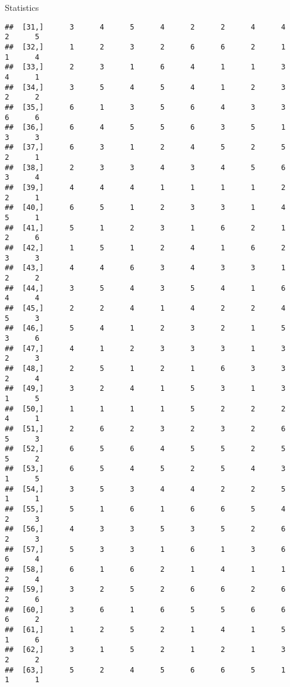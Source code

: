 \documentclass[
  ignorenonframetext,
]{beamer}
\begin{document}
\begin{frame}[fragile]{Statistics}
\begin{verbatim}
##  [31,]      3      4      5      4      2      2      4      4      2      5
##  [32,]      1      2      3      2      6      6      2      1      1      4
##  [33,]      2      3      1      6      4      1      1      3      4      1
##  [34,]      3      5      4      5      4      1      2      3      2      2
##  [35,]      6      1      3      5      6      4      3      3      6      6
##  [36,]      6      4      5      5      6      3      5      1      3      3
##  [37,]      6      3      1      2      4      5      2      5      2      1
##  [38,]      2      3      3      4      3      4      5      6      3      4
##  [39,]      4      4      4      1      1      1      1      2      2      1
##  [40,]      6      5      1      2      3      3      1      4      5      1
##  [41,]      5      1      2      3      1      6      2      1      2      6
##  [42,]      1      5      1      2      4      1      6      2      3      3
##  [43,]      4      4      6      3      4      3      3      1      2      2
##  [44,]      3      5      4      3      5      4      1      6      4      4
##  [45,]      2      2      4      1      4      2      2      4      5      3
##  [46,]      5      4      1      2      3      2      1      5      3      6
##  [47,]      4      1      2      3      3      3      1      3      2      3
##  [48,]      2      5      1      2      1      6      3      3      2      4
##  [49,]      3      2      4      1      5      3      1      3      1      5
##  [50,]      1      1      1      1      5      2      2      2      4      1
##  [51,]      2      6      2      3      2      3      2      6      5      3
##  [52,]      6      5      6      4      5      5      2      5      5      2
##  [53,]      6      5      4      5      2      5      4      3      1      5
##  [54,]      3      5      3      4      4      2      2      5      1      1
##  [55,]      5      1      6      1      6      6      5      4      2      3
##  [56,]      4      3      3      5      3      5      2      6      2      3
##  [57,]      5      3      3      1      6      1      3      6      6      4
##  [58,]      6      1      6      2      1      4      1      1      2      4
##  [59,]      3      2      5      2      6      6      2      6      2      6
##  [60,]      3      6      1      6      5      5      6      6      6      2
##  [61,]      1      2      5      2      1      4      1      5      1      6
##  [62,]      3      1      5      2      1      2      1      3      2      2
##  [63,]      5      2      4      5      6      6      5      1      1      1

\end{verbatim}
\end{frame}
\end{document}
